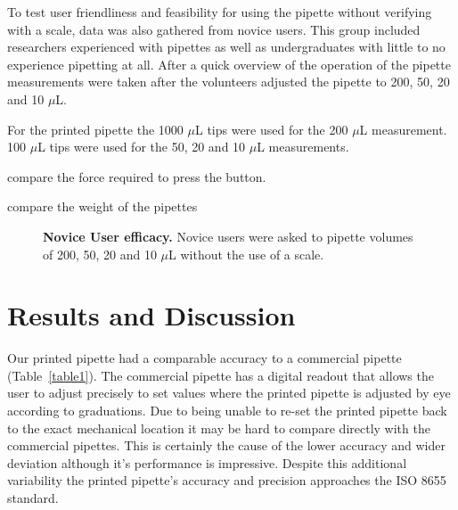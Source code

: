 \documentclass[10pt,letterpaper]{article}
\begin{document}
To test user friendliness and feasibility for using the pipette without verifying with a scale, data was also gathered from novice users. 
This group included researchers experienced with pipettes as well as undergraduates with little to no experience pipetting at all.
After a quick overview of the operation of the pipette measurements were taken after the volunteers adjusted the pipette to 200, 50, 20 and 10 $\mu$L. 

For the printed pipette the 1000 $\mu$L tips were used for the 200 $\mu$L measurement. 100 $\mu$L tips were used for the 50, 20 and 10 $\mu$L measurements.

compare the force required to press the button.

compare the weight of the pipettes



\begin{figure}[h]
\caption{{\bf Novice User efficacy.}
Novice users were asked to pipette volumes of 200, 50, 20 and 10 $\mu$L without the use of a scale.}
\label{fig3}
\end{figure}


\section*{Results and Discussion}

Our printed pipette had a comparable accuracy to a commercial pipette (Table~\ref{table1}).
The commercial pipette has a digital readout that allows the user to adjust precisely to set values where the printed pipette is adjusted by eye according to graduations.
Due to being unable to re-set the printed pipette back to the exact mechanical location it may be hard to compare directly with the commercial pipettes.
This is certainly the cause of the lower accuracy and wider deviation although it's performance is impressive.
Despite this additional variability the printed pipette's accuracy and precision approaches the ISO 8655 standard.
\end{document}
